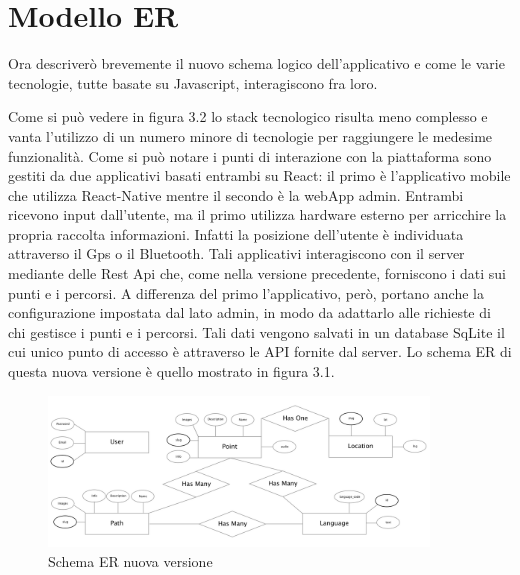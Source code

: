 \section{Modello ER}\vspace{5mm}

Ora descriverò brevemente il nuovo schema logico dell'applicativo e come le varie tecnologie, tutte basate su Javascript, interagiscono fra loro.

\vspace{5mm}Come si può vedere in figura 3.2 lo stack tecnologico risulta meno complesso e vanta l'utilizzo di un numero minore di tecnologie per raggiungere le medesime funzionalità. Come si può notare i punti di interazione con la piattaforma sono gestiti da due applicativi basati entrambi su React: il primo è l'applicativo mobile che utilizza React-Native mentre il secondo è la webApp admin. Entrambi ricevono input dall'utente, ma il primo utilizza hardware esterno per arricchire la propria raccolta informazioni. Infatti la posizione dell'utente è individuata attraverso il Gps o il Bluetooth. Tali applicativi interagiscono con il server mediante delle Rest Api che, come nella versione precedente, forniscono i dati sui punti e i percorsi. A differenza del primo l'applicativo, però, portano anche la configurazione impostata dal lato admin, in modo da adattarlo alle richieste di chi gestisce i punti e i percorsi. Tali dati vengono salvati in un database SqLite il cui unico punto di accesso è attraverso le API fornite dal server. Lo schema ER di questa nuova versione è quello mostrato in figura 3.1.

\begin{figure}[h]
\centering
\includegraphics[width=0.9\textwidth]{images/erNew.png}
\caption{Schema ER nuova versione}
\end{figure}

